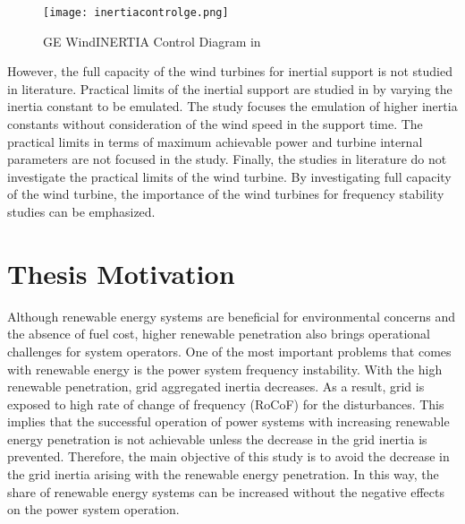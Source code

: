 \begin{figure}[h!]
	\centering
	\texttt{[image: inertiacontrolge.png]}
	\caption{GE WindINERTIA Control Diagram in \cite{Clark2009}}
	\label{inertiacontrolge}
\end{figure}
However, the full capacity of the wind turbines for inertial support is not studied in literature. Practical limits of the inertial support are studied in \cite{Gonzalez-Longatt2016} by varying the inertia constant to be emulated. The study focuses the emulation of higher inertia constants without consideration of the wind speed in the support time. The practical limits in terms of maximum achievable power and turbine internal parameters are not focused in the study. Finally, the studies in literature do not investigate the practical limits of the wind turbine. By investigating full capacity of the wind turbine, the importance of the wind turbines for frequency stability studies can be emphasized. 
\section{Thesis Motivation}
Although renewable energy systems are beneficial for environmental concerns and the absence of fuel cost, higher renewable penetration also brings operational challenges for system operators. One of the most important problems that comes with renewable energy is the power system frequency instability. With the high renewable penetration, grid aggregated inertia decreases. As a result, grid is exposed to high rate of change of frequency (RoCoF) for the disturbances. This implies that the successful operation of power systems with increasing renewable energy penetration is not achievable unless the decrease in the grid inertia is prevented. Therefore, the main objective of this study is to avoid the decrease in the grid inertia arising with the renewable energy penetration. In this way, the share of renewable energy systems can be increased without the negative effects on the power system operation.

